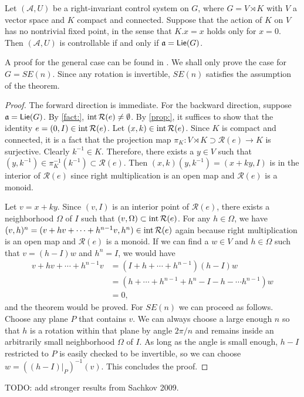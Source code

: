 \documentclass[12pt,class=article,crop=false]{standalone}
\begin{document}
\begin{theorem}
Let $ (\mathcal{A},U)$ be a right-invariant control system on $G$, where $ G = V \rtimes K$ with $ V$ a vector space and  $ K$ compact and connected. Suppose that the action of $ K$ on $ V$ has no nontrivial fixed point, in the sense that  $ K.x = x$ holds only for  $ x=0$. Then $ (\mathcal{A},U)$ is controllable if and only if $ \mathfrak{a} = \mathsf{Lie}( G)$.
\end{theorem}
A proof for the general case can be found in \cite{}. We shall only prove the case for $ G = SE(n)$. Since any rotation is invertible, $ SE(n)$ satisfies the assumption of the theorem.
\begin{proof}
The forward direction is immediate. For the backward direction, suppose $ \mathfrak{a} = \mathsf{Lie}( G)$. By \cref{fact:}, $ \operatorname{int}  \mathcal{R}( e) \neq \emptyset $. By \cref{prop:}, it suffices to show that the identity $ e = (0,I) \in \operatorname{int} \mathcal{R}( e) $. Let $ (x,k) \in \operatorname{int} \mathcal{R}( e) $. Since $ K$ is compact and connected, it is a fact that the projection map $ \pi_K: V \rtimes  K \supset  \mathcal{R}( e) \to K  $ is surjective. Clearly $ k^{-1} \in K$. Therefore, there exists a $ y \in V$ such that $ (y,k^{-1}) \in \pi_K^{-1}(k^{-1}) \subset \mathcal{R}( e) $. Then $ (x,k)(y,k^{-1}) = (x+ky,I)$ is in the interior of $ \mathcal{R}( e)$ since right multiplication is an open map and $ \mathcal{R}( e) $ is a monoid.

Let $ v = x+ky$. Since $ (v,I)$ is an interior point of  $ \mathcal{R}( e) $, there exists a neighborhood $ \Omega$ of $ I$ such that  $ (v, \Omega) \subset \operatorname{int} \mathcal{R}( e) $. For any $ h \in \Omega$, we have $ (v,h)^{n} = (v+hv+ \cdots + h^{n-1} v, h^{n}) \in \operatorname{int} \mathcal{R}( e) $ again because right multiplication is an open map and $ \mathcal{R}( e) $ is a monoid. If we can find a $ w \in V$ and $ h \in \Omega$ such that $ v=(h-I)w$ and  $ h^{n} = I$, we would have
\begin{align*}
	v+ h v + \cdots + h^{n-1}v &= (I+h+ \cdots + h^{n-1})(h-I)w \\
	&= (h+ \cdots + h^{n-1}+ h^{n} - I - h - \cdots h^{n-1})w \\
	&= 0 ,
\end{align*}
and the theorem would be proved. For $ SE(n)$ we can proceed as follows. Choose any plane $ P$ that contains $ v$. We can always choose a large enough  $ n$ so that  $ h$ is a rotation within that plane by angle $ 2 \pi /n$ and remains inside an arbitrarily small neighborhood $ \Omega$ of $ I$. As long as the angle is small enough,  $ h-I$ restricted to  $ P$ is easily checked to be invertible, so we can choose $ w = ((h-I)|_P)^{-1}(v)$. This concludes the proof.
\end{proof}
TODO: add stronger results from Sachkov 2009.
\end{document}
